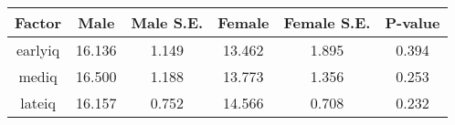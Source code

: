 \begin{longtable}{c c c c c c}
\toprule
\textbf{Factor} & \textbf{Male} & \textbf{Male S.E.}  & \textbf{Female} & \textbf{Female S.E.} & \textbf{P-value} \\
\midrule
earlyiq & 16.136 & 1.149 &  13.462 & 1.895 & 0.394 \\
mediq & 16.500 & 1.188 &  13.773 & 1.356 & 0.253 \\
lateiq & 16.157 & 0.752 &  14.566 & 0.708 & 0.232 \\
\bottomrule
\end{longtable}
